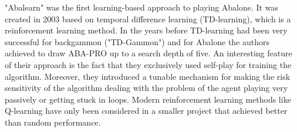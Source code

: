 "Abalearn" was the first learning-based approach to playing Abalone. \cite{campos_abalearn_2003} It was created in 2003 based on temporal difference learning (TD-learning), which is a reinforcement learning method. In the years before TD-learning had been very successful for backgammon ("TD-Gammon") \cite{tesauro_td-gammon_1994} and for Abalone the authors achieved to draw ABA-PRO up to a search depth of five. An interesting feature of their approach is the fact that they exclusively used self-play for training the algorithm. Moreover, they introduced a tunable mechanism for making the risk sensitivity of the algorithm dealing with the problem of the agent playing very passively or getting stuck in loops. Modern reinforcement learning methods like Q-learning have only been considered in a smaller project that achieved better than random performance. \cite{mizrachi_introduction_2017}

